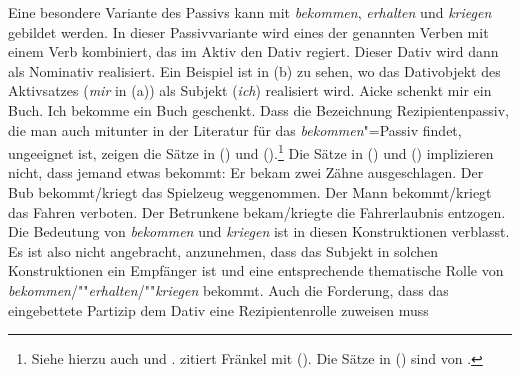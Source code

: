 %

Eine besondere Variante des Passivs kann mit \emph{bekommen},
\emph{erhalten} und \emph{kriegen}
gebildet werden. In dieser Passivvariante wird eines der genannten Verben
mit einem Verb kombiniert, das im Aktiv den Dativ regiert. Dieser Dativ wird dann
als Nominativ realisiert. Ein Beispiel ist in (b) zu sehen, wo
das Dativobjekt des Aktivsatzes (\emph{mir} in (a)) als Subjekt (\emph{ich})
realisiert wird.
\eal
\ex{}
Aicke schenkt mir      ein Buch.
\ex\label{ex-ich-bekommen-ein-buch-geschenkt} 
Ich     bekomme ein Buch       geschenkt.
\zl
Dass die Bezeichnung Rezipientenpassiv, die man auch mitunter in der 
Literatur für das \emph{bekommen}"=Passiv findet,
ungeeignet ist, zeigen die Sätze in () und ().\footnote{
        Siehe hierzu auch  
        und . 
        \citet*[]{Eroms78} zitiert Fränkel %
        mit (). %
        Die Sätze in () sind von \citet*[]{Reis76a}.
}
Die Sätze in () und () implizieren nicht, dass jemand etwas bekommt:
\ea{}
\label{bsp-zaehne-ausgeschlagen}
Er bekam zwei Zähne ausgeschlagen.
\z
\eal
\label{bsp-bekommen-passiv-mit-akk}
\ex
Der Bub bekommt/kriegt das Spielzeug weggenommen.
\ex{}
Der Mann bekommt/kriegt das Fahren  verboten.
\ex{}
Der Betrunkene bekam/kriegte die Fahrerlaubnis     entzogen.
\zl
Die Bedeutung von \emph{bekommen} und \emph{kriegen} ist in diesen
Konstruktionen verblasst. Es ist also nicht angebracht, anzunehmen,
dass das Subjekt in solchen Konstruktionen ein Empfänger ist und
eine entsprechende thematische Rolle von \emph{bekommen}/""\emph{erhalten}/""\emph{kriegen}
bekommt. Auch die Forderung, dass das eingebettete Partizip dem
Dativ eine Rezipientenrolle zuweisen muss
